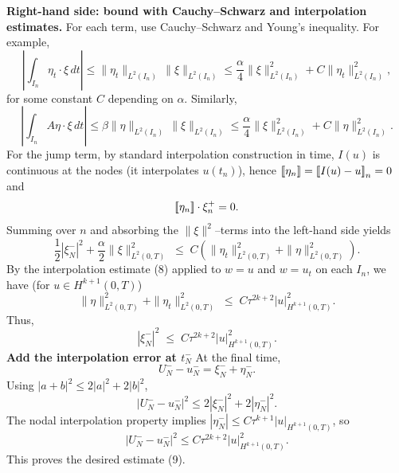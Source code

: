 \textbf{Right-hand side: bound with Cauchy--Schwarz and interpolation estimates.}
For each term, use Cauchy--Schwarz and Young's inequality. For example,
\[
    \left|\int_{I_n} \eta_t\cdot\xi\,dt\right|
    \le \|\eta_t\|_{L^2(I_n)}\,\|\xi\|_{L^2(I_n)}
    \le \frac{\alpha}{4}\|\xi\|_{L^2(I_n)}^2
    + C\|\eta_t\|_{L^2(I_n)}^2,
\]
for some constant $C$ depending on $\alpha$.
Similarly,
\[
    \left|\int_{I_n} A\eta\cdot\xi\,dt\right|
    \le \beta\|\eta\|_{L^2(I_n)}\,\|\xi\|_{L^2(I_n)}
    \le \frac{\alpha}{4}\|\xi\|_{L^2(I_n)}^2
    + C\|\eta\|_{L^2(I_n)}^2.
\]
For the jump term, by standard interpolation construction in time,
$I(u)$ is continuous at the nodes (it interpolates $u(t_n)$), hence
$\left[\!\left[ \eta_n \right]\!\right] = \left[\!\left[ I(u)-u \right]\!\right]_n=0$ and
\[
    \left[\!\left[ \eta_n \right]\!\right]\cdot\xi_n^+ = 0.
\]
Summing over $n$ and absorbing the $\|\xi\|^2$--terms into the left-hand side yields
\[
    \frac12|\xi_N^-|^2 + \frac{\alpha}{2}\|\xi\|_{L^2(0,T)}^2
    \;\le\;
    C\left(
    \|\eta_t\|_{L^2(0,T)}^2 + \|\eta\|_{L^2(0,T)}^2
    \right).
\]
By the interpolation estimate (8) applied to $w=u$ and $w=u_t$ on each $I_n$, we have
(for $u\in H^{k+1}(0,T)$)
\[
    \|\eta\|_{L^2(0,T)}^2 + \|\eta_t\|_{L^2(0,T)}^2
    \;\le\;
    C \tau^{2k+2} |u|_{H^{k+1}(0,T)}^2.
\]
Thus,
\[
    |\xi_N^-|^2 \;\le\; C\tau^{2k+2}|u|_{H^{k+1}(0,T)}^2.
\]
\textbf{Add the interpolation error at $t_N^-$}
At the final time,
\[
    U_N^- - u_N^- = \xi_N^- + \eta_N^-.
\]
Using $|a+b|^2 \le 2|a|^2 + 2|b|^2$,
\[
    |U_N^- - u_N^-|^2
    \le 2|\xi_N^-|^2 + 2|\eta_N^-|^2.
\]
The nodal interpolation property implies
$|\eta_N^-| \le C\tau^{k+1}|u|_{H^{k+1}(0,T)}$, so
\[
    |U_N^- - u_N^-|^2
    \le C\tau^{2k+2}|u|_{H^{k+1}(0,T)}^2.
\]
This proves the desired estimate (9).
